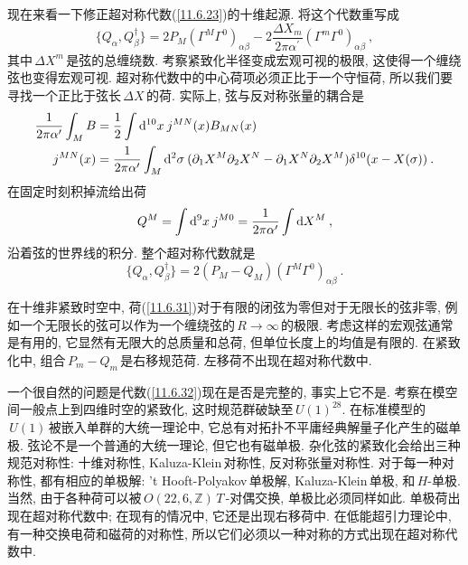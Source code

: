现在来看一下修正超对称代数(\ref{11.6.23})的十维起源. 将这个代数重写成
\begin{equation}
    \{Q_{\alpha},Q^{\dag}_{\beta}\}=2P_{M}(\Gamma^{M}\Gamma^{0})_{\alpha\beta}-2\frac{\Delta X_{m}}{2\pi\alpha^{\prime}}(\Gamma^{m}\Gamma^{0})_{\alpha\beta}\:,\label{11.6.29}
\end{equation}
其中$\,\Delta X^{m}\,$是弦的总缠绕数. 考察紧致化半径变成宏观可视的极限, 这使得一个缠绕弦也变得宏观可视. 超对称代数中的中心荷项必须正比于一个守恒荷, 所以我们要寻找一个正比于弦长$\,\Delta X\,$的荷. 实际上, 弦与反对称张量的耦合是
\begin{subequations}
    \begin{align}
        \frac{1}{2\pi\alpha^{\prime}}\int_{M} B &=\frac{1}{2}\int \mathrm{d}^{10}x\:j^{MN}(x)B_{MN}(x) \label{11.6.30a} \\
        j^{MN}(x) &= \frac{1}{2\pi\alpha^{\prime}} \int_{M}\mathrm{d}^{2}\sigma\: (\partial_{1}X^{M}\partial_{2}X^{N}-\partial_{1}X^{N}\partial_{2}X^{M})\delta^{10}(x-X(\sigma))\:.\label{11.6.30b}
    \end{align}
\end{subequations}
在固定时刻积掉流给出荷
\begin{equation}
    Q^{M} = \int\mathrm{d}^{9}x\:j^{M0}=\frac{1}{2\pi\alpha^{\prime}}\int\mathrm{d} X^{M} \:, \label{11.6.31}
\end{equation}
沿着弦的世界线的积分. 整个超对称代数就是
\begin{equation}
    \{Q_{\alpha},Q^{\dag}_{\beta}\}=2(P_{M}-Q_{M})(\Gamma^{M}\Gamma^{0})_{\alpha\beta}\:. \label{11.6.32}
\end{equation}

在十维非紧致时空中, 荷(\ref{11.6.31})对于有限的闭弦为零但对于无限长的弦非零, 例如一个无限长的弦可以作为一个缠绕弦的$\,R\to\infty\,$的极限. 考虑这样的宏观弦通常是有用的, 它显然有无限大的总质量和总荷, 但单位长度上的均值是有限的. 在紧致化中, 组合$\,P_{m}-Q_{m}\,$是右移规范荷. 左移荷不出现在超对称代数中.

一个很自然的问题是代数(\ref{11.6.32})现在是否是完整的, 事实上它不是. 考察在模空间一般点上到四维时空的紧致化, 这时规范群破缺至$\,U(1)^{28}$. 在标准模型的$\,U(1)\,$被嵌入单群的大统一理论中, 它总有对拓扑不平庸经典解量子化产生的磁单极. 弦论不是一个普通的大统一理论, 但它也有磁单极. 杂化弦的紧致化会给出三种规范对称性: 十维对称性, Kaluza-Klein\,对称性, 反对称张量对称性. 对于每一种对称性, 都有相应的单极解: 't Hooft-Polyakov\,单极解, Kaluza-Klein\,单极, 和\,$H$-单极. 当然, 由于各种荷可以被$\,O(22,6,\mathds{Z})\,T\,$-对偶交换, 单极比必须同样如此. 单极荷出现在超对称代数中; 在现有的情况中, 它还是出现右移荷中. 在低能超引力理论中, 有一种交换电荷和磁荷的对称性, 所以它们必须以一种对称的方式出现在超对称代数中.  